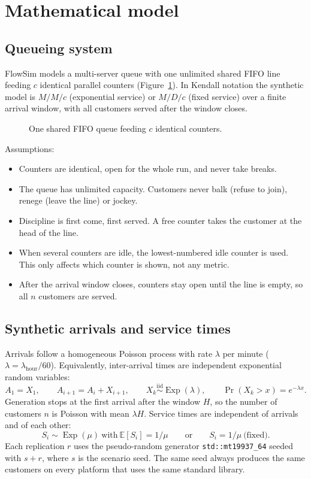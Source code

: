 \documentclass[11pt,a4paper]{article}
\newcommand{\code}[1]{\texttt{#1}}
\begin{document}
\section{Mathematical model}
\subsection{Queueing system}
FlowSim models a multi-server queue with one unlimited shared FIFO line feeding $c$ identical parallel counters
(Figure~\ref{fig:queue}). In Kendall notation the synthetic model is $M/M/c$ (exponential service) or $M/D/c$ (fixed
service) over a finite arrival window, with all customers served after the window closes.

\begin{figure}[H]\centering\queuediagram\caption{One shared FIFO queue feeding $c$ identical counters.}\label{fig:queue}\end{figure}

Assumptions:
\begin{itemize}
  \item Counters are identical, open for the whole run, and never take breaks.
  \item The queue has unlimited capacity. Customers never balk (refuse to join), renege (leave the line) or jockey.
  \item Discipline is first come, first served. A free counter takes the customer at the head of the line.
  \item When several counters are idle, the lowest-numbered idle counter is used. This only affects which counter is
    shown, not any metric.
  \item After the arrival window closes, counters stay open until the line is empty, so all $n$ customers are served.
\end{itemize}

\subsection{Synthetic arrivals and service times}
Arrivals follow a homogeneous Poisson process with rate $\lambda$ per minute ($\lambda = \lambda_{\text{hour}}/60$).
Equivalently, inter-arrival times are independent exponential random variables:
\[
  A_1 = X_1,\qquad A_{i+1} = A_i + X_{i+1},\qquad X_k \stackrel{\text{iid}}{\sim} \operatorname{Exp}(\lambda),\qquad
  \Pr(X_k > x)=e^{-\lambda x}.
\]
Generation stops at the first arrival after the window $H$, so the number of customers $n$ is Poisson with mean
$\lambda H$. Service times are independent of arrivals and of each other:
\[
  S_i \sim \operatorname{Exp}(\mu)\ \text{with}\ \mathbb{E}[S_i]=1/\mu \qquad\text{or}\qquad S_i = 1/\mu\ \text{(fixed)}.
\]
Each replication $r$ uses the pseudo-random generator \code{std::mt19937\_64} seeded with $s+r$, where $s$ is the scenario
seed. The same seed always produces the same customers on every platform that uses the same standard library.
\end{document}
